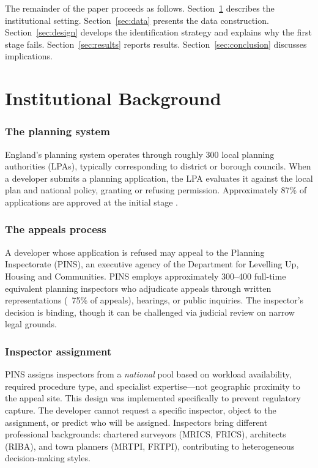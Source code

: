 \documentclass[12pt]{article}
\begin{document}
The remainder of the paper proceeds as follows. Section~\ref{sec:background} describes the institutional setting. Section~\ref{sec:data} presents the data construction. Section~\ref{sec:design} develops the identification strategy and explains why the first stage fails. Section~\ref{sec:results} reports results. Section~\ref{sec:conclusion} discusses implications.

\section{Institutional Background}
\label{sec:background}

\subsubsection*{The planning system} England's planning system operates through roughly 300 local planning authorities (LPAs), typically corresponding to district or borough councils. When a developer submits a planning application, the LPA evaluates it against the local plan and national policy, granting or refusing permission. Approximately 87\% of applications are approved at the initial stage \citep{mhclg2023planning}.

\subsubsection*{The appeals process} A developer whose application is refused may appeal to the Planning Inspectorate (PINS), an executive agency of the Department for Levelling Up, Housing and Communities. PINS employs approximately 300--400 full-time equivalent planning inspectors who adjudicate appeals through written representations (~75\% of appeals), hearings, or public inquiries. The inspector's decision is binding, though it can be challenged via judicial review on narrow legal grounds.

\subsubsection*{Inspector assignment} PINS assigns inspectors from a \textit{national} pool based on workload availability, required procedure type, and specialist expertise---not geographic proximity to the appeal site. This design was implemented specifically to prevent regulatory capture. The developer cannot request a specific inspector, object to the assignment, or predict who will be assigned. Inspectors bring different professional backgrounds: chartered surveyors (MRICS, FRICS), architects (RIBA), and town planners (MRTPI, FRTPI), contributing to heterogeneous decision-making styles.
\end{document}
